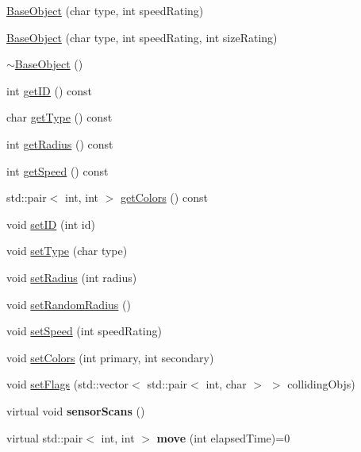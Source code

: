 \begin{DoxyCompactItemize}
\item 
\hyperlink{classBaseObject_ae6fa65bf33f26d46a6aa1a5ef9ee63c9}{Base\-Object} (char type, int speed\-Rating)
\item 
\hyperlink{classBaseObject_ababc1565c1eb8038f6c85886b9c3781c}{Base\-Object} (char type, int speed\-Rating, int size\-Rating)
\item 
\hyperlink{classBaseObject_a83eecfd3bdaffda4e6c7d0fb98747f96}{$\sim$\-Base\-Object} ()
\item 
int \hyperlink{classBaseObject_a6d4bd3f6a445bf8f4c304582e5a8c71d}{get\-I\-D} () const 
\item 
char \hyperlink{classBaseObject_ab333e5027b28d1dbe97736297efd1b94}{get\-Type} () const 
\item 
int \hyperlink{classBaseObject_a6dc634df2e679f28ab1435d494a3375e}{get\-Radius} () const 
\item 
int \hyperlink{classBaseObject_ac46f29b5be2bc1036115e5ee76f3996f}{get\-Speed} () const 
\item 
std\-::pair$<$ int, int $>$ \hyperlink{classBaseObject_a85cace89c6a85cb8e312e6e8a1decf29}{get\-Colors} () const 
\item 
void \hyperlink{classBaseObject_ad983298291c7600a244caebedd25bdfc}{set\-I\-D} (int id)
\item 
void \hyperlink{classBaseObject_a97b5625fa993c44e523f6f7be4230b4b}{set\-Type} (char type)
\item 
void \hyperlink{classBaseObject_a4157e3766c87cf1cda114a6239e1298c}{set\-Radius} (int radius)
\item 
void \hyperlink{classBaseObject_a662c7c9fd38d0dcfc102c737a0dbc5f8}{set\-Random\-Radius} ()
\item 
void \hyperlink{classBaseObject_a968935f7fc333e5ed67f7cbfe526720b}{set\-Speed} (int speed\-Rating)
\item 
void \hyperlink{classBaseObject_a33b50bfd5a5be9b504194aeadecc5e1e}{set\-Colors} (int primary, int secondary)
\item 
void \hyperlink{classBaseObject_ab89fb453f3e974db33f131bcce4559d6}{set\-Flags} (std\-::vector$<$ std\-::pair$<$ int, char $>$ $>$ colliding\-Objs)
\item 
\hypertarget{classBaseObject_a8608698c308c58ebf3a7f03541556b05}{virtual void {\bfseries sensor\-Scans} ()}\label{classBaseObject_a8608698c308c58ebf3a7f03541556b05}

\item 
\hypertarget{classBaseObject_a74591ce3c625f36937d43040557937f6}{virtual std\-::pair$<$ int, int $>$ {\bfseries move} (int elapsed\-Time)=0}\label{classBaseObject_a74591ce3c625f36937d43040557937f6}

\end{DoxyCompactItemize}
